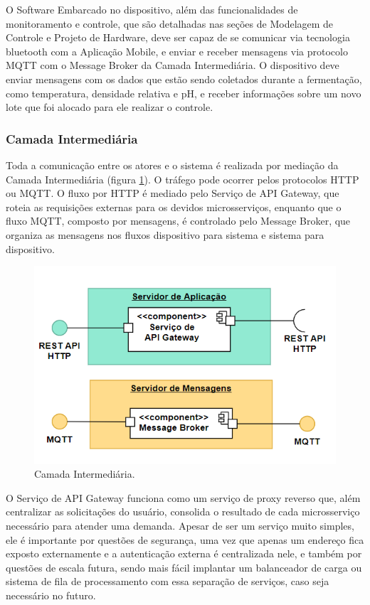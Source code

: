 O Software Embarcado no dispositivo, além das funcionalidades de monitoramento e controle, que são detalhadas nas seções de Modelagem de Controle e Projeto de Hardware, deve ser capaz de se comunicar via tecnologia bluetooth com a Aplicação Mobile, e enviar e receber mensagens via protocolo MQTT com o Message Broker da Camada Intermediária. O dispositivo deve enviar mensagens com os dados que estão sendo coletados durante a fermentação, como temperatura, densidade relativa e pH, e receber informações sobre um novo lote que foi alocado para ele realizar o controle.

\subsubsection{Camada Intermediária}

Toda a comunicação entre os atores e o sistema é realizada por mediação da Camada Intermediária (figura \ref{fig:camada_intermediaria}). O tráfego pode ocorrer pelos protocolos HTTP ou MQTT. O fluxo por HTTP é mediado pelo Serviço de API Gateway, que roteia as requisições externas para os devidos microsserviços, enquanto que o fluxo MQTT, composto por mensagens, é controlado pelo Message Broker, que organiza as mensagens nos fluxos dispositivo para sistema e sistema para dispositivo.

\begin{figure}[h]
    \centering
    \includegraphics[scale=0.50]{figuras/projeto/software/camada_intermediaria.PNG}
    \caption{Camada Intermediária.}
    \label{fig:camada_intermediaria}
\end{figure}

O Serviço de API Gateway funciona como um serviço de proxy reverso que, além centralizar as solicitações do usuário, consolida o resultado de cada microsserviço necessário para atender uma demanda. Apesar de ser um serviço muito simples, ele é importante por questões de segurança, uma vez que apenas um endereço fica exposto externamente e a autenticação externa é centralizada nele, e também por questões de escala futura, sendo mais fácil implantar um balanceador de carga ou sistema de fila de processamento com essa separação de serviços, caso seja necessário no futuro.

